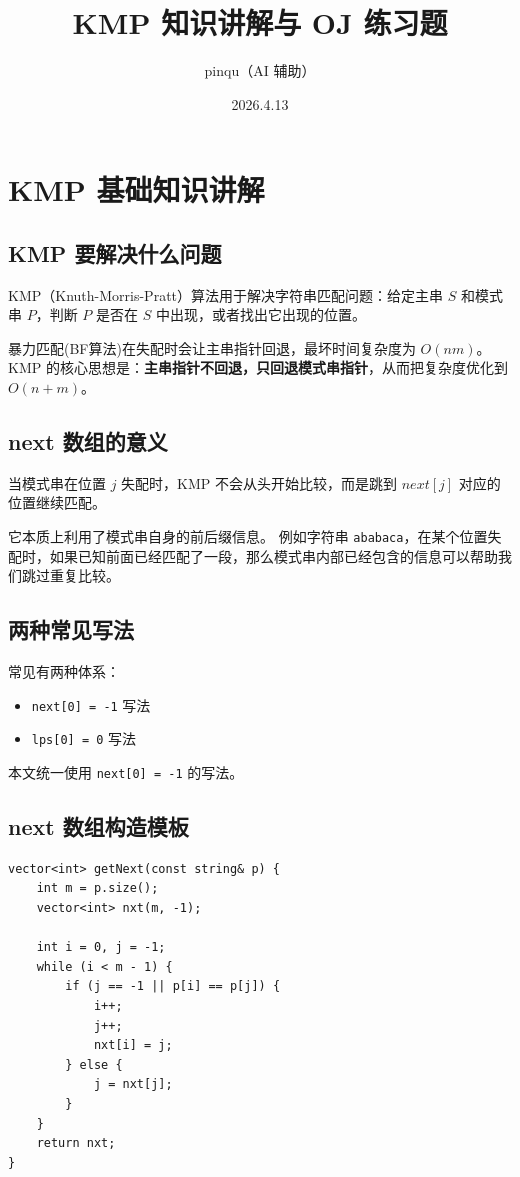 \documentclass[12pt,a4paper]{article}
\title{KMP 知识讲解与 OJ 练习题}
\author{pinqu（AI 辅助）}
\date{2026.4.13}
\begin{document}
\maketitle

\section{KMP 基础知识讲解}

\subsection{KMP 要解决什么问题}
KMP（Knuth-Morris-Pratt）算法用于解决字符串匹配问题：给定主串 $S$ 和模式串 $P$，判断 $P$ 是否在 $S$ 中出现，或者找出它出现的位置。

暴力匹配(BF算法)在失配时会让主串指针回退，最坏时间复杂度为 $O(nm)$。  
KMP 的核心思想是：\textbf{主串指针不回退，只回退模式串指针}，从而把复杂度优化到 $O(n+m)$。

\subsection{next 数组的意义}
当模式串在位置 $j$ 失配时，KMP 不会从头开始比较，而是跳到 $next[j]$ 对应的位置继续匹配。

它本质上利用了模式串自身的前后缀信息。  
例如字符串 \texttt{ababaca}，在某个位置失配时，如果已知前面已经匹配了一段，那么模式串内部已经包含的信息可以帮助我们跳过重复比较。

\subsection{两种常见写法}
常见有两种体系：

\begin{itemize}
    \item \texttt{next[0] = -1} 写法
    \item \texttt{lps[0] = 0} 写法
\end{itemize}

本文统一使用 \texttt{next[0] = -1} 的写法。

\subsection{next 数组构造模板}
\begin{lstlisting}
vector<int> getNext(const string& p) {
    int m = p.size();
    vector<int> nxt(m, -1);

    int i = 0, j = -1;
    while (i < m - 1) {
        if (j == -1 || p[i] == p[j]) {
            i++;
            j++;
            nxt[i] = j;
        } else {
            j = nxt[j];
        }
    }
    return nxt;
}
\end{lstlisting}
\end{document}
